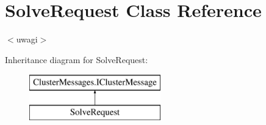 \hypertarget{class_solve_request}{}\section{Solve\+Request Class Reference}
\label{class_solve_request}


$<$uwagi$>$  


Inheritance diagram for Solve\+Request\+:\begin{figure}[H]
\begin{center}
\leavevmode
\includegraphics[height=2.000000cm]{class_solve_request}
\end{center}
\end{figure}
